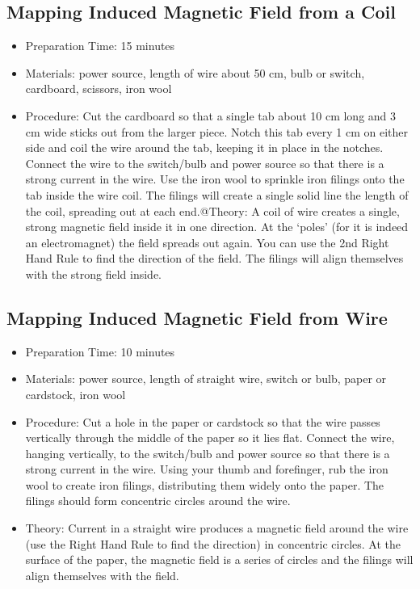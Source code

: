 \subsection{Mapping Induced Magnetic Field from a Coil}
\begin{itemize}
\item{Preparation Time: 15 minutes}
\item{Materials: power source, length of wire about 50 cm, bulb or switch, cardboard, scissors, iron wool}
\item{Procedure: Cut the cardboard so that a single tab about 10 cm long and 3 cm wide sticks out from the larger piece. Notch this tab every 1 cm on either side and coil the wire around the tab, keeping it in place in the notches. Connect the wire to the switch/bulb and power source so that there is a strong current in the wire. Use the iron wool to sprinkle iron filings onto the tab inside the wire coil. The filings will create a single solid line the length of the coil, spreading out at each end.@Theory: A coil of wire creates a single, strong magnetic field inside it in one direction. At the ‘poles’ (for it is indeed an electromagnet) the field spreads out again. You can use the 2nd Right Hand Rule to find the direction of the field. The filings will align themselves with the strong field inside.}
\end{itemize}

\subsection{Mapping Induced Magnetic Field from Wire}
\begin{itemize}
\item{Preparation Time: 10 minutes}
\item{Materials: power source, length of straight wire, switch or bulb, paper or cardstock, iron wool}
\item{Procedure: Cut a hole in the paper or cardstock so that the wire passes vertically through the middle of the paper so it lies flat. Connect the wire, hanging vertically, to the switch/bulb and power source so that there is a strong current in the wire. Using your thumb and forefinger, rub the iron wool to create iron filings, distributing them widely onto the paper. The filings should form concentric circles around the wire.}
\item{Theory: Current in a straight wire produces a magnetic field around the wire (use the Right Hand Rule to find the direction) in concentric circles. At the surface of the paper, the magnetic field is a series of circles and the filings will align themselves with the field.}
\end{itemize}

